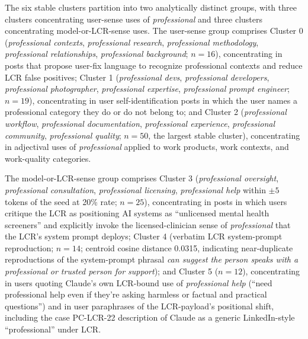 \documentclass[11pt]{article}
\begin{document}
The six stable clusters partition into two analytically distinct groups, with three clusters concentrating user-sense uses of \emph{professional} and three clusters concentrating model-or-LCR-sense uses. The user-sense group comprises Cluster 0 (\emph{professional contexts}, \emph{professional research}, \emph{professional methodology}, \emph{professional relationships}, \emph{professional background}; $n = 16$), concentrating in posts that propose user-fix language to recognize professional contexts and reduce LCR false positives; Cluster 1 (\emph{professional devs}, \emph{professional developers}, \emph{professional photographer}, \emph{professional expertise}, \emph{professional prompt engineer}; $n = 19$), concentrating in user self-identification posts in which the user names a professional category they do or do not belong to; and Cluster 2 (\emph{professional workflow}, \emph{professional documentation}, \emph{professional experience}, \emph{professional community}, \emph{professional quality}; $n = 50$, the largest stable cluster), concentrating in adjectival uses of \emph{professional} applied to work products, work contexts, and work-quality categories.

The model-or-LCR-sense group comprises Cluster 3 (\emph{professional oversight}, \emph{professional consultation}, \emph{professional licensing}, \emph{professional help} within $\pm 5$ tokens of the seed at 20\% rate; $n = 25$), concentrating in posts in which users critique the LCR as positioning AI systems as ``unlicensed mental health screeners'' and explicitly invoke the licensed-clinician sense of \emph{professional} that the LCR's system prompt deploys; Cluster 4 (verbatim LCR system-prompt reproduction; $n = 14$; centroid cosine distance 0.0315, indicating near-duplicate reproductions of the system-prompt phrasal \emph{can suggest the person speaks with a professional or trusted person for support}); and Cluster 5 ($n = 12$), concentrating in users quoting Claude's own LCR-bound use of \emph{professional help} (``need professional help even if they're asking harmless or factual and practical questions'') and in user paraphrases of the LCR-payload's positional shift, including the case PC-LCR-22 description of Claude as a generic LinkedIn-style ``professional'' under LCR.
\end{document}
